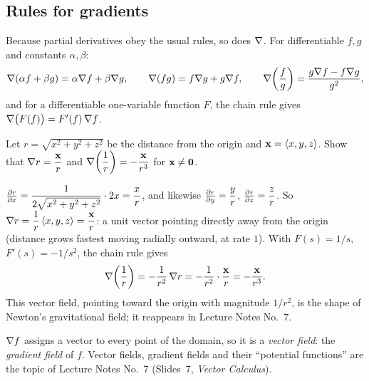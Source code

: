\subsection{Rules for gradients}

Because partial derivatives obey the usual rules, so does $\nabla$. For
differentiable $f,g$ and constants $\alpha,\beta$:
\[
  \nabla(\alpha f+\beta g)=\alpha\nabla f+\beta\nabla g,\qquad
  \nabla(fg)=f\nabla g+g\nabla f,\qquad
  \nabla\!\left(\frac fg\right)=\frac{g\nabla f-f\nabla g}{g^2},
\]
and for a differentiable one-variable function $F$, the chain rule gives
$\nabla\big(F(f)\big)=F'(f)\,\nabla f$.

\begin{example}\label{ex:grad-r}
Let $r=\sqrt{x^2+y^2+z^2}$ be the distance from the origin and
$\mathbf{x}=\left\langle x,y,z \right\rangle$. Show that $\nabla r=\dfrac{\mathbf{x}}{r}$ and
$\nabla\!\left(\dfrac1r\right)=-\dfrac{\mathbf{x}}{r^3}$ for $\mathbf{x}\neq\mathbf{0}$.
\end{example}
\begin{solution}
 $\frac{\partial r}{\partial x}=\dfrac{1}{2\sqrt{x^2+y^2+z^2}}\cdot2x=\dfrac xr$, and
likewise $\frac{\partial r}{\partial y}=\dfrac yr$, $\frac{\partial r}{\partial z}=\dfrac zr$. So $\nabla r=\dfrac1r\left\langle x,y,z \right\rangle=\dfrac{\mathbf{x}}{r}$:
a unit vector pointing directly away from the origin (distance grows fastest
moving radially outward, at rate $1$).
 With $F(s)=1/s$, $F'(s)=-1/s^2$, the chain rule gives
\[
  \nabla\!\left(\frac1r\right)=-\frac1{r^2}\,\nabla r=-\frac{1}{r^2}\cdot\frac{\mathbf{x}}{r}=-\frac{\mathbf{x}}{r^3}.
\]
This vector field, pointing toward the origin with magnitude $1/r^2$, is the
shape of Newton's gravitational field; it reappears in Lecture Notes No.~7.
\end{solution}

\begin{remark}
$\nabla f$ assigns a vector to every point of the domain, so it is a
\emph{vector field}: the \emph{gradient field} of $f$. Vector fields, gradient
fields and their ``potential functions'' are the topic of Lecture Notes
No.~7 (Slides~7, \emph{Vector Calculus}).
\end{remark}
